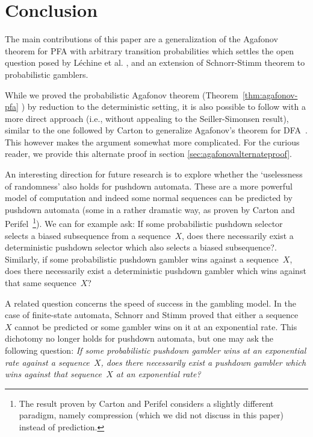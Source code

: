 \documentclass[11pt]{article}
\begin{document}
\section{Conclusion}
The main contributions of this paper are a generalization
of the Agafonov theorem for PFA with arbitrary transition probabilities which settles the open question posed by L\'echine et al. \cite{LechineSS2024},
and an extension of Schnorr-Stimm theorem to probabilistic gamblers.  

While we proved the probabilistic Agafonov theorem (Theorem~\ref{thm:agafonov-pfa} ) by reduction to the deterministic setting, it is also possible to follow with a more direct approach (i.e., without appealing to the Seiller-Simonsen result), similar to the one followed by Carton to generalize Agafonov's theorem for DFA~\cite{Carton2020}. This however makes the argument somewhat more complicated. For the curious reader, we provide this alternate proof in section \ref{sec:agafonovalternateproof}.

An interesting direction for future research is to explore whether the `uselessness of randomness' also holds for pushdown automata. These are a more powerful model of computation and indeed some normal sequences can be predicted by pushdown automata (some in a rather dramatic way, as proven by Carton and Perifel~\cite{CartonP2024}\footnote{The result proven by Carton and Perifel considers a slightly different paradigm, namely compression (which we did not discuss in this paper) instead of prediction.}). We can for example ask: If some probabilistic pushdown selector selects a biased subsequence from a sequence~$X$, does there necessarily exist a deterministic pushdown selector which also selects a biased subsequence?. Similarly, if some probabilistic pushdown gambler wins against a sequence~$X$, does there necessarily exist a deterministic pushdown gambler which wins against that same sequence~$X$?

%
%
A related question concerns the speed of success in the gambling model. In the case of finite-state automata, Schnorr and Stimm proved that either a sequence~$X$ cannot be predicted or some gambler wins on it at an exponential rate. This dichotomy no longer holds for pushdown automata, but one may ask the following question: \emph{If some probabilistic pushdown gambler wins at an exponential rate against a sequence~$X$, does there necessarily exist a pushdown gambler which wins against that sequence~$X$ at an exponential rate?}
 


\end{document}
